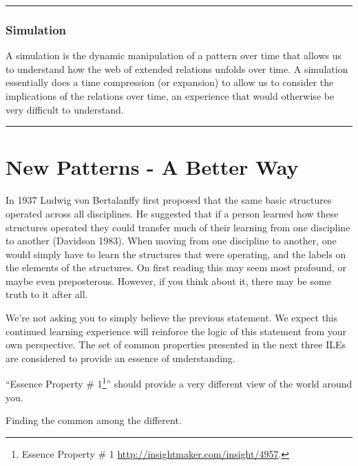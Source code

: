 \documentclass[]{memoir}
\begin{document}
\begin{center}\rule{3in}{0.4pt}\end{center}

\subsubsection{Simulation}

A simulation is the dynamic manipulation of a pattern over time that
allows us to understand how the web of extended relations unfolds over
time. A simulation essentially does a time compression (or expansion) to
allow us to consider the implications of the relations over time, an
experience that would otherwise be very difficult to understand.

\begin{center}\rule{3in}{0.4pt}\end{center}

\section{New Patterns - A Better Way}

In 1937 Ludwig von Bertalanffy first proposed that the same basic
structures operated across all disciplines. He suggested that if a
person learned how these structures operated they could transfer much of
their learning from one discipline to another (Davidson 1983). When
moving from one discipline to another, one would simply have to learn
the structures that were operating, and the labels on the elements of
the structures. On first reading this may seem most profound, or maybe
even preposterous. However, if you think about it, there may be some
truth to it after all.

We're not asking you to simply believe the previous statement. We expect
this continued learning experience will reinforce the logic of this
statement from your own perspective. The set of common properties
presented in the next three ILEs are considered to provide an essence of
understanding.

``Essence Property \# 1\footnote{Essence Property \# 1
  \url{http://insightmaker.com/insight/4957}.}'' should provide a very
different view of the world around you.

\FloatBarrier 

\begin{model}[frametitle={Model: Essence Property \# 1}] 

 Finding the common among the different.




 \end{model}
\end{document}
